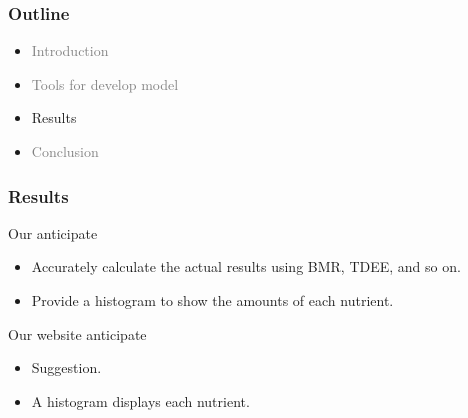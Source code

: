 \documentclass[fleqn]{beamer}
\begin{document}
\begin{frame}
\frametitle{Outline}
\begin{itemize}
        \item \textcolor{gray}{Introduction}
        \vspace{0.15 cm}
        \item \textcolor{gray}{Tools for develop model}
        \vspace{0.15 cm}
        \item Results
        \vspace{0.15 cm}
        \item \textcolor{gray}{Conclusion}
        \vspace{0.15 cm}
\end{itemize}
\end{frame}
\begin{frame}
\frametitle{Results}
    \pause
     \begin{minipage}[t]{0.48\textwidth}
        \begin{block}{Our anticipate}
         \pause
            \begin{itemize}
                \item Accurately calculate the actual results using BMR, TDEE, and so on. \\
                \pause
                \item Provide a histogram to show the amounts of each nutrient. 
            \end{itemize}
        \end{block}
    \end{minipage}%
    \hfill
    \pause
    \begin{minipage}[t]{0.48\textwidth}
        \begin{block}{Our website anticipate}
            \begin{itemize}
            \pause
                \item Suggestion.
                \pause
                \item A histogram displays each nutrient.
            \end{itemize}
        \end{block}
\end{minipage}
\end{frame}
\end{document}
